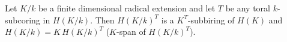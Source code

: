 Let $K/k$ be a finite dimensional radical extension and let $T$ be any toral $k$-subcoring in $H(K/k)$. Then $H(K/k)^T$ is a $K^T$-subbiring of $H(K)$ and $H(K/k) = K\,H(K/k)^T$ ($K$-span of $H(K/k)^T$).

